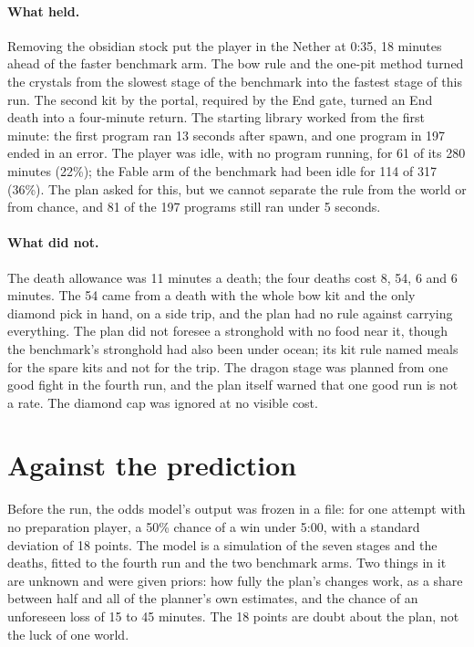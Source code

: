 \documentclass[11pt,a4paper]{article}
\begin{document}
\paragraph{What held.} Removing the obsidian stock put the player in the Nether at 0:35, 18 minutes ahead of the faster benchmark arm. The bow rule and the one-pit method turned the crystals from the slowest stage of the benchmark into the fastest stage of this run. The second kit by the portal, required by the End gate, turned an End death into a four-minute return. The starting library worked from the first minute: the first program ran 13 seconds after spawn, and one program in 197 ended in an error. The player was idle, with no program running, for 61 of its 280 minutes (22\%); the Fable arm of the benchmark had been idle for 114 of 317 (36\%). The plan asked for this, but we cannot separate the rule from the world or from chance, and 81 of the 197 programs still ran under 5 seconds.

\paragraph{What did not.} The death allowance was 11 minutes a death; the four deaths cost 8, 54, 6 and 6 minutes. The 54 came from a death with the whole bow kit and the only diamond pick in hand, on a side trip, and the plan had no rule against carrying everything. The plan did not foresee a stronghold with no food near it, though the benchmark's stronghold had also been under ocean; its kit rule named meals for the spare kits and not for the trip. The dragon stage was planned from one good fight in the fourth run, and the plan itself warned that one good run is not a rate. The diamond cap was ignored at no visible cost.

\section{Against the prediction}
\label{sec:bayes}

Before the run, the odds model's output was frozen in a file: for one attempt with no preparation player, a 50\% chance of a win under 5:00, with a standard deviation of 18 points. The model is a simulation of the seven stages and the deaths, fitted to the fourth run and the two benchmark arms. Two things in it are unknown and were given priors: how fully the plan's changes work, as a share between half and all of the planner's own estimates, and the chance of an unforeseen loss of 15 to 45 minutes. The 18 points are doubt about the plan, not the luck of one world.
\end{document}
